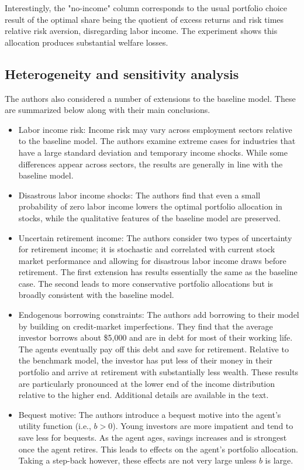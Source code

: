 \documentclass[./CGMPortfolio.tex]{subfiles}
\begin{document}
Interestingly, the "no-income" column corresponds to the usual portfolio choice result of the optimal share being the quotient of excess returns and risk times relative risk aversion, disregarding labor income. The experiment shows this allocation produces substantial welfare losses.

\subsection{Heterogeneity and sensitivity analysis}

The authors also considered a number of extensions to the baseline model. These are summarized below along with their main conclusions.
\begin{itemize}
	\item Labor income risk: Income risk may vary across employment sectors relative to the baseline model. The authors examine extreme cases for industries that have a large standard deviation and temporary income shocks. While some differences appear across sectors, the results are generally in line with the baseline model.
	\item Disastrous labor income shocks: The authors find that even a small probability of zero labor income lowers the optimal portfolio allocation in stocks, while the qualitative features of the baseline model are preserved.
	\item Uncertain retirement income: The authors consider two types of uncertainty for retirement income; it is stochastic and correlated with current stock market performance and allowing for disastrous labor income draws before retirement. The first extension has results essentially the same as the baseline case. The second leads to more conservative portfolio allocations but is broadly consistent with the baseline model.
	\item Endogenous borrowing constraints: The authors add borrowing to their model by building on credit-market imperfections. They find that the average investor borrows about \$5,000 and are in debt for most of their working life. The agents eventually pay off this debt and save for retirement. Relative to the benchmark model, the investor has put less of their money in their portfolio and arrive at retirement with substantially less wealth. These results are particularly pronounced at the lower end of the income distribution relative to the higher end. Additional details are available in the text.
	\item Bequest motive: The authors introduce a bequest motive into the agent's utility function (i.e., $b>0$). Young investors are more impatient and tend to save less for bequests. As the agent ages, savings increases and is strongest once the agent retires. This leads to effects on the agent's portfolio allocation. Taking a step-back however, these effects are not very large unless $b$ is large.

\end{itemize}
\end{document}
